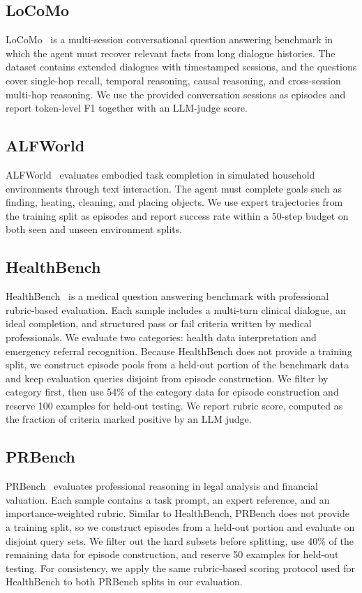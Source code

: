 \subsection{LoCoMo}
\label{app:dataset-locomo}

LoCoMo~\citep{locomo} is a multi-session conversational question answering benchmark in which the agent must recover relevant facts from long dialogue histories.
The dataset contains extended dialogues with timestamped sessions, and the questions cover single-hop recall, temporal reasoning, causal reasoning, and cross-session multi-hop reasoning.
We use the provided conversation sessions as episodes and report token-level F1 together with an LLM-judge score.

\subsection{ALFWorld}
\label{app:dataset-alfworld}

ALFWorld~\citep{alfworld} evaluates embodied task completion in simulated household environments through text interaction.
The agent must complete goals such as finding, heating, cleaning, and placing objects.
We use expert trajectories from the training split as episodes and report success rate within a 50-step budget on both seen and unseen environment splits.

\subsection{HealthBench}
\label{app:dataset-healthbench}

HealthBench~\citep{healthbench} is a medical question answering benchmark with professional rubric-based evaluation.
Each sample includes a multi-turn clinical dialogue, an ideal completion, and structured pass or fail criteria written by medical professionals.
We evaluate two categories: health data interpretation and emergency referral recognition.
Because HealthBench does not provide a training split, we construct episode pools from a held-out portion of the benchmark data and keep evaluation queries disjoint from episode construction.
We filter by category first, then use 54\% of the category data for episode construction and reserve 100 examples for held-out testing.
We report rubric score, computed as the fraction of criteria marked positive by an LLM judge.

\subsection{PRBench}
\label{app:dataset-prbench}
PRBench~\citep{prbench} evaluates professional reasoning in legal analysis and financial valuation.
Each sample contains a task prompt, an expert reference, and an importance-weighted rubric.
Similar to HealthBench, PRBench does not provide a training split, so we construct episodes from a held-out portion and evaluate on disjoint query sets.
We filter out the hard subsets before splitting, use 40\% of the remaining data for episode construction, and reserve 50 examples for held-out testing.
For consistency, we apply the same rubric-based scoring protocol used for HealthBench to both PRBench splits in our evaluation.

